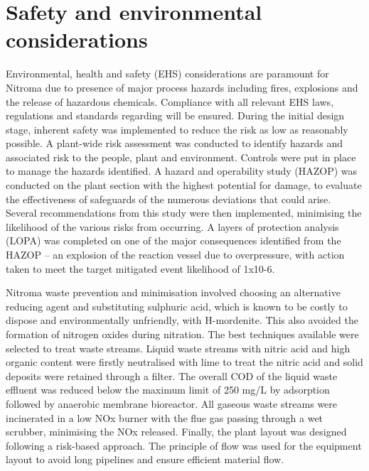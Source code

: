 \section*{Safety and environmental considerations}

Environmental, health and safety (EHS) considerations are paramount for Nitroma due to presence of major process hazards including fires, explosions and the release of hazardous chemicals. Compliance with all relevant EHS laws, regulations and standards regarding will be ensured.  During the initial design stage, inherent safety was implemented to reduce the risk as low as reasonably possible. A plant-wide risk assessment was conducted to identify hazards and associated risk to the people, plant and environment. Controls were put in place to manage the hazards identified. A hazard and operability study (HAZOP) was conducted on the plant section with the highest potential for damage, to evaluate the effectiveness of safeguards of the numerous deviations that could arise. Several recommendations from this study were then implemented, minimising the likelihood of the various risks from occurring. A layers of protection analysis (LOPA) was completed on one of the major consequences identified from the HAZOP – an explosion of the reaction vessel due to overpressure, with action taken to meet the target mitigated event likelihood of 1x10-6.  

Nitroma waste prevention and minimisation involved choosing an alternative reducing agent and substituting sulphuric acid, which is known to be costly to dispose and environmentally unfriendly, with H-mordenite. This also avoided the formation of nitrogen oxides during nitration. The best techniques available were selected to treat waste streams. Liquid waste streams with nitric acid and high organic content were firstly neutralised with lime to treat the nitric acid and solid deposits were retained through a filter. The overall COD of the liquid waste effluent was reduced below the maximum limit of 250 mg/L by adsorption followed by anaerobic membrane bioreactor. All gaseous waste streams were incinerated in a low NOx burner with the flue gas passing through a wet scrubber, minimising the NOx released. Finally, the plant layout was designed following a risk-based approach. The principle of flow was used for the equipment layout to avoid long pipelines and ensure efficient material flow. 